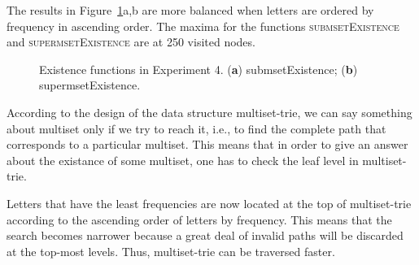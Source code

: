 \documentclass[algorithms,article,accept,pdftex,moreauthors]{Definitions/mdpi}
\begin{document}
%

The results in Figure~\ref{fig:e4m1}a,b are more balanced when 
letters are ordered by frequency in ascending order. The maxima for the functions 
\textsc{submsetExistence} and \textsc{supermsetExistence} are at 250 visited nodes. 

\begin{figure}[H]

\caption{Existence functions in Experiment 4. (\textbf{a}) submsetExistence; (\textbf{b}) supermsetExistence. \label{fig:e4m1}}
\end{figure}

According to the design of the data structure multiset-trie, we can say 
something about multiset only if we try to reach it, i.e., to find the complete 
path that corresponds to a particular multiset. This means that in order to give 
an answer about the existance of some multiset, one has to check the leaf level in 
multiset-trie. 

Letters that have the least frequencies are now located at the top of 
multiset-trie according to the ascending order of letters by frequency. This means 
that the search becomes narrower because a great deal of invalid paths will be 
discarded at the top-most levels. Thus, multiset-trie can be traversed faster.
\end{document}
